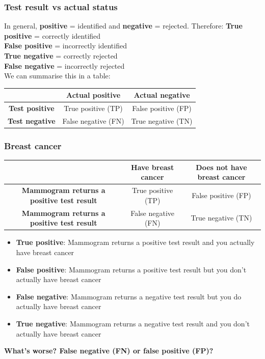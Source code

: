 \documentclass[a4paper]{article}\usepackage[]{graphicx}\usepackage[]{xcolor}
\begin{document}
\subsubsection{Test result vs actual status}
In general, \textbf{positive} = identified and \textbf{negative} = rejected. Therefore:
\textbf{True positive} = correctly identified \\
\textbf{False positive} = incorrectly identified \\
\textbf{True negative} = correctly rejected \\
\textbf{False negative} = incorrectly rejected \\
We can summarise this in a table:
\begin{table}[H]
	\centering
	\begin{tabular}{@{}c|cc@{}}
	\toprule
						   & \textbf{Actual positive} & \textbf{Actual negative} \\ \midrule
	\textbf{Test positive}  & True positive (TP)       & False positive (FP)      \\
	\textbf{Test negative} & False negative (FN)      & True negative (TN)       \\ \bottomrule
	\end{tabular}
\end{table}
\subsubsection{Breast cancer}
\begin{table}[H]
	\centering
	\begin{tabular}{@{}c|cc@{}}
	\toprule
						   & \textbf{Have breast cancer} & \textbf{Does not have breast cancer} \\ \midrule
	\textbf{Mammogram returns a positive test result} & True positive (TP)       & False positive (FP)      \\
	\textbf{Mammogram returns a positive test result} & False negative (FN)      & True negative (TN)       \\ \bottomrule
	\end{tabular}
\end{table}
\begin{itemize}
	\item \textbf{True positive}: Mammogram returns a positive test result and you actually have breast cancer
	\item \textbf{False positive}: Mammogram returns a positive test result but you don't actually have breast cancer
	\item \textbf{False negative}: Mammogram returns a negative test result but you do actually have breast cancer
	\item \textbf{True negative}: Mammogram returns a negative test result and you don't actually have breast cancer
\end{itemize}
\begin{greenbox}
	\textbf{What's worse? False negative (FN) or false positive (FP)?}
\end{greenbox}
\end{document}
